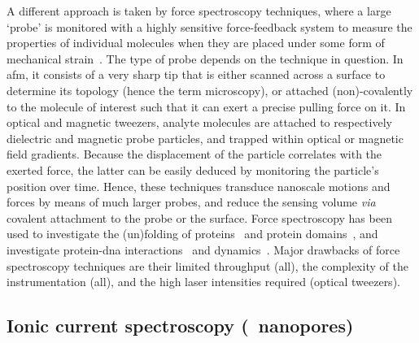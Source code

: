A different approach is taken by force spectroscopy techniques, where a large `probe' is monitored with a
highly sensitive force-feedback system to measure the properties of individual molecules when they are placed
under some form of mechanical strain~\cite{Neuman-2008}. The type of probe depends on the technique in
question. In \gls{afm}, it consists of a very sharp tip that is either scanned across a surface to determine
its topology (hence the term microscopy), or attached (non)-covalently to the molecule of interest such that
it can exert a precise pulling force on it. In optical and magnetic tweezers, analyte molecules are attached
to respectively dielectric and magnetic probe particles, and trapped within optical or magnetic field
gradients. Because the displacement of the particle correlates with the exerted force, the latter can be
easily deduced by monitoring the particle's position over time. Hence, these techniques transduce nanoscale
motions and forces by means of much larger probes, and reduce the sensing volume \textit{via} covalent
attachment to the probe or the surface. Force spectroscopy has been used to investigate the (un)folding of
proteins~\cite{Bustamante-2020,Jagannathan-2013} and protein domains~\cite{Rief-1997,Kellermayer-1997}, and
investigate protein-\gls{dna} interactions~\cite{Abbondanzieri-2005,Shlyakhtenko-2007,Vanderlinden-2019} and
dynamics~\cite{Lyubchenko-2018,Brouns-2018}. Major drawbacks of force spectroscopy techniques are their
limited throughput (all), the complexity of the instrumentation (all), and the high laser intensities required
(optical tweezers).


\subsection{Ionic current spectroscopy (\ie~nanopores)}
%

